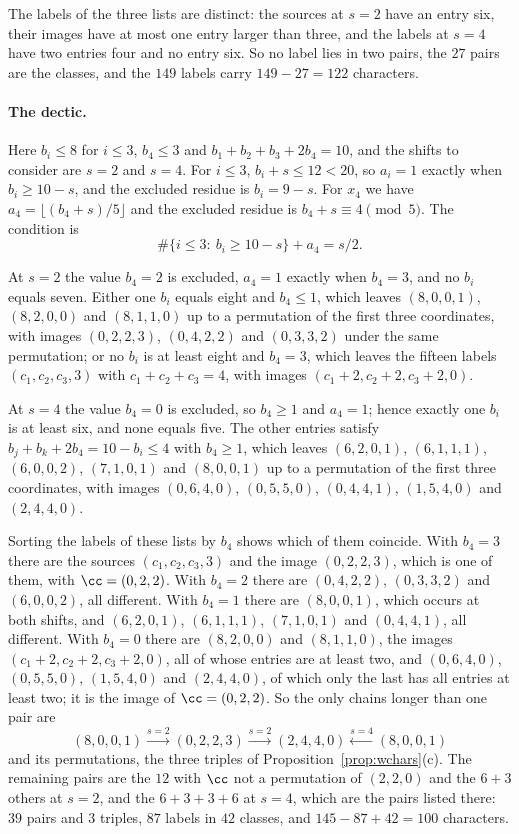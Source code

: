 The labels of the three lists are distinct: the sources at $s=2$ have an
entry six, their images have at most one entry larger than three, and the
labels at $s=4$ have two entries four and no entry six. So no label lies in
two pairs, the $27$ pairs are the classes, and the $149$ labels carry
$149-27=122$ characters.

\paragraph*{The dectic.}
Here $b_i\le8$ for $i\le3$, $b_4\le3$ and $b_1+b_2+b_3+2b_4=10$, and the
shifts to consider are $s=2$ and $s=4$. For $i\le3$, $b_i+s\le12<20$, so
$a_i=1$ exactly when $b_i\ge10-s$, and the excluded residue is
$b_i=9-s$. For $x_4$ we have $a_4=\lfloor(b_4+s)/5\rfloor$ and the excluded
residue is $b_4+s\equiv4\pmod5$. The condition is
\[
\#\{i\le3:\ b_i\ge10-s\}+a_4=s/2 .
\]

At $s=2$ the value $b_4=2$ is excluded, $a_4=1$ exactly when $b_4=3$, and
no $b_i$ equals seven. Either one $b_i$ equals eight and $b_4\le1$, which
leaves $(8,0,0,1)$, $(8,2,0,0)$ and $(8,1,1,0)$ up to a permutation of the
first three coordinates, with images $(0,2,2,3)$, $(0,4,2,2)$ and
$(0,3,3,2)$ under the same permutation; or no $b_i$ is at least eight and
$b_4=3$, which leaves the fifteen labels $(c_1,c_2,c_3,3)$ with
$c_1+c_2+c_3=4$, with images $(c_1+2,c_2+2,c_3+2,0)$.

At $s=4$ the value $b_4=0$ is excluded, so $b_4\ge1$ and $a_4=1$; hence
exactly one $b_i$ is at least six, and none equals five. The other entries
satisfy $b_j+b_k+2b_4=10-b_i\le4$ with $b_4\ge1$, which leaves
$(6,2,0,1)$, $(6,1,1,1)$, $(6,0,0,2)$, $(7,1,0,1)$ and $(8,0,0,1)$ up to
a permutation of the first three coordinates, with images $(0,6,4,0)$,
$(0,5,5,0)$, $(0,4,4,1)$, $(1,5,4,0)$ and $(2,4,4,0)$.

Sorting the labels of these lists by $b_4$ shows which of them coincide.
With $b_4=3$ there are the sources $(c_1,c_2,c_3,3)$ and the image
$(0,2,2,3)$, which is one of them, with $\cc=(0,2,2)$. With $b_4=2$ there
are $(0,4,2,2)$, $(0,3,3,2)$ and $(6,0,0,2)$, all different. With $b_4=1$
there are $(8,0,0,1)$, which occurs at both shifts, and $(6,2,0,1)$,
$(6,1,1,1)$, $(7,1,0,1)$ and $(0,4,4,1)$, all different. With $b_4=0$ there
are $(8,2,0,0)$ and $(8,1,1,0)$, the images $(c_1+2,c_2+2,c_3+2,0)$, all of
whose entries are at least two, and $(0,6,4,0)$, $(0,5,5,0)$, $(1,5,4,0)$
and $(2,4,4,0)$, of which only the last has all entries at least two; it is
the image of $\cc=(0,2,2)$. So the only chains longer than one pair are
\[
(8,0,0,1)\xrightarrow{s=2}(0,2,2,3)\xrightarrow{s=2}
(2,4,4,0)\xleftarrow{s=4}(8,0,0,1)
\]
and its permutations, the three triples of Proposition~\ref{prop:wchars}(c).
The remaining pairs are the $12$ with $\cc$ not a permutation of $(2,2,0)$
and the $6+3$ others at $s=2$, and the $6+3+3+6$ at $s=4$, which are the
pairs listed there: $39$ pairs and $3$ triples, $87$ labels in $42$ classes,
and $145-87+42=100$ characters.

